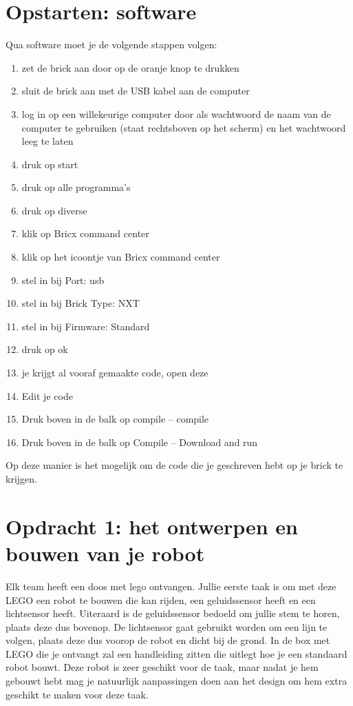 \documentclass[11pt]{article} %
\begin{document}
\section*{Opstarten: software}
Qua software moet je de volgende stappen volgen:
\begin{enumerate}
\item zet de brick aan door op de oranje knop te drukken
\item sluit de brick aan met de USB kabel aan de computer
\item log in op een willekeurige computer door als wachtwoord de naam van de computer te gebruiken (staat rechtsboven op het scherm) en het wachtwoord leeg te laten
\item druk op start
\item druk op alle programma's
\item druk op diverse
\item klik op Bricx command center
\item klik op het icoontje van Bricx command center
\item stel in bij Port: usb
\item stel in bij Brick Type: NXT
\item stel in bij Firmware: Standard
\item druk op ok
\item je krijgt al vooraf gemaakte code, open deze
\item Edit je code
\item Druk boven in de balk op compile -- compile
\item Druk boven in de balk op Compile -- Download and run
\end{enumerate}
Op deze manier is het mogelijk om de code die je geschreven hebt op je brick te krijgen.  

\section*{Opdracht 1: het ontwerpen en bouwen van je robot}
Elk team heeft een doos met lego ontvangen. 
Jullie eerste taak is om met deze LEGO een robot te bouwen die kan rijden, een geluidssensor heeft en een lichtsensor heeft. 
Uiteraard is de geluidssensor bedoeld om jullie stem te horen, plaats deze dus bovenop. 
De lichtsensor gaat gebruikt worden om een lijn te volgen, plaats deze dus voorop de robot en dicht bij de grond. 
In de box met LEGO die je ontvangt zal een handleiding zitten die uitlegt hoe je een standaard robot bouwt. 
Deze robot is zeer geschikt voor de taak, maar nadat je hem gebouwt hebt mag je natuurlijk aanpassingen doen aan het design om hem extra geschikt te maken voor deze taak.  
\end{document}
